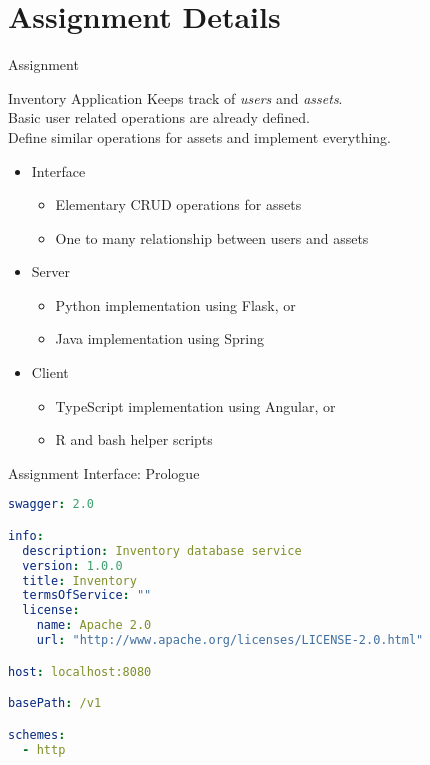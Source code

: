 \section{Assignment Details}


\begin{frame}{Assignment}
    \begin{block}{Inventory Application}
        Keeps track of \emph{users} and \emph{assets}. \\
        Basic user related operations are already defined. \\
        Define similar operations for assets and implement everything.
    \end{block}

    \begin{itemize}
        \item Interface
        \begin{itemize}
            \item Elementary CRUD operations for assets
            \item One to many relationship between users and assets
        \end{itemize}
        \item Server
        \begin{itemize}
            \item Python implementation using Flask, or
            \item Java implementation using Spring
        \end{itemize}
        \item Client
        \begin{itemize}
            \item TypeScript implementation using Angular, or
            \item R and bash helper scripts
        \end{itemize}
    \end{itemize}
\end{frame}


\begin{frame}[fragile]{Assignment Interface: Prologue}
\begin{lstlisting}[language=yaml,style=mini]
swagger: 2.0

info:
  description: Inventory database service
  version: 1.0.0
  title: Inventory
  termsOfService: ""
  license:
    name: Apache 2.0
    url: "http://www.apache.org/licenses/LICENSE-2.0.html"

host: localhost:8080

basePath: /v1

schemes:
  - http
\end{lstlisting}
\end{frame}


